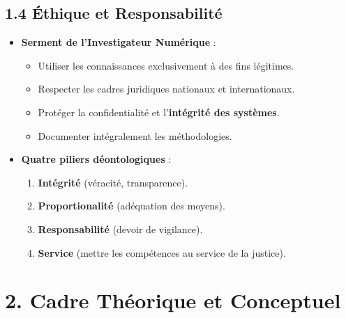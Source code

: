 \documentclass[12pt, a4paper]{report}
\begin{document}
\subsection*{1.4 Éthique et Responsabilité}
\begin{itemize}
    \item \textbf{Serment de l’Investigateur Numérique} :
    \begin{itemize}
        \item Utiliser les connaissances exclusivement à des fins légitimes.
        \item Respecter les cadres juridiques nationaux et internationaux.
        \item Protéger la confidentialité et l’\textbf{intégrité des systèmes}.
        \item Documenter intégralement les méthodologies.
    \end{itemize}
    \item \textbf{Quatre piliers déontologiques} :
    \begin{enumerate}
        \item \textbf{Intégrité} (véracité, transparence).
        \item \textbf{Proportionalité} (adéquation des moyens).
        \item \textbf{Responsabilité} (devoir de vigilance).
        \item \textbf{Service} (mettre les compétences au service de la justice).
    \end{enumerate}
\end{itemize}

\section*{2. Cadre Théorique et Conceptuel}
\end{document}
